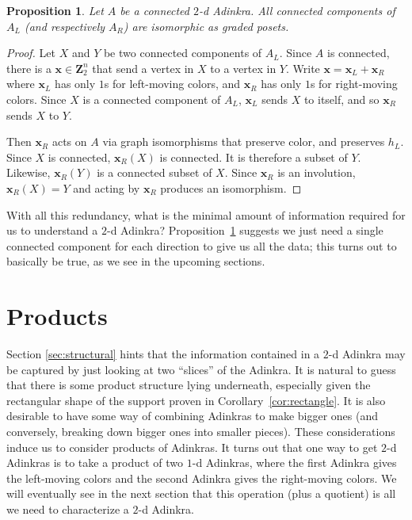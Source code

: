 \documentclass[12pt,twoside,singlespace]{article}
\numberwithin{equation}{section}
\newtheorem{prop}[equation]{Proposition}
\theoremstyle{definition}
\newcommand{\ZZ}{\mathbf{Z}}
\renewcommand{\vec}[1]{\mathbf{#1}}
\begin{document}
\begin{prop}
\label{prop:kevin}
Let $A$ be a connected $2$-d Adinkra.  All connected components of $A_L$ (and respectively $A_R$) are isomorphic as graded posets.
\end{prop}

\begin{proof}
Let $X$ and $Y$ be two connected components of $A_L$.  Since $A$ is connected, there is a $\vec{x}\in \ZZ_2^n$ that send a vertex in $X$ to a vertex in $Y$.  Write $\vec{x}=\vec{x}_L+\vec{x}_R$ where $\vec{x}_L$ has only $1$s for left-moving colors, and $\vec{x}_R$ has only $1$s for right-moving colors.  Since $X$ is a connected component of $A_L$, $\vec{x}_L$ sends $X$ to itself, and so $\vec{x}_R$ sends $X$ to $Y$.

Then $\vec{x}_R$ acts on $A$ via graph isomorphisms that preserve color, and preserves $h_L$.  Since $X$ is connected, $\vec{x}_R(X)$ is connected.  It is therefore a subset of $Y$.  Likewise, $\vec{x}_R(Y)$ is a connected subset of $X$.  Since $\vec{x}_R$ is an involution, $\vec{x}_R(X)=Y$ and acting by $\vec{x}_R$ produces an isomorphism.
\end{proof}

With all this redundancy, what is the minimal amount of information required for us to understand a $2$-d Adinkra? Proposition~\ref{prop:kevin} suggests we just need a single connected component for each direction to give us all the data; this turns out to basically be true, as we see in the upcoming sections.



\section{Products}
\label{sec:products}

Section \ref{sec:structural} hints that the information contained in a $2$-d Adinkra may be captured by just looking at two ``slices'' of the Adinkra. It is natural to guess that there is some product structure lying underneath, especially given the rectangular shape of the support proven in Corollary~\ref{cor:rectangle}. It is also desirable to have some way of combining Adinkras to make bigger ones (and conversely, breaking down bigger ones into smaller pieces). These considerations induce us to consider products of Adinkras. It turns out that one way to get $2$-d Adinkras is to take a product of two $1$-d Adinkras, where the first Adinkra gives the left-moving colors and the second Adinkra gives the right-moving colors. We will eventually see in the next section that this operation (plus a quotient) is all we need to characterize a $2$-d Adinkra.
\end{document}
